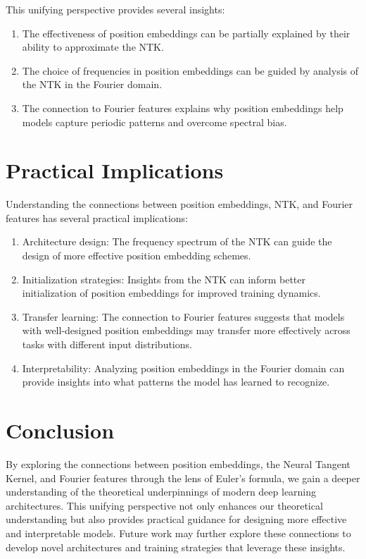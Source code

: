 \documentclass{article}
\begin{document}
This unifying perspective provides several insights:

\begin{enumerate}
    \item The effectiveness of position embeddings can be partially explained by their ability to approximate the NTK.
    \item The choice of frequencies in position embeddings can be guided by analysis of the NTK in the Fourier domain.
    \item The connection to Fourier features explains why position embeddings help models capture periodic patterns and overcome spectral bias.
\end{enumerate}

\section{Practical Implications}

Understanding the connections between position embeddings, NTK, and Fourier features has several practical implications:

\begin{enumerate}
    \item Architecture design: The frequency spectrum of the NTK can guide the design of more effective position embedding schemes.
    \item Initialization strategies: Insights from the NTK can inform better initialization of position embeddings for improved training dynamics.
    \item Transfer learning: The connection to Fourier features suggests that models with well-designed position embeddings may transfer more effectively across tasks with different input distributions.
    \item Interpretability: Analyzing position embeddings in the Fourier domain can provide insights into what patterns the model has learned to recognize.
\end{enumerate}

\section{Conclusion}

By exploring the connections between position embeddings, the Neural Tangent Kernel, and Fourier features through the lens of Euler's formula, we gain a deeper understanding of the theoretical underpinnings of modern deep learning architectures. This unifying perspective not only enhances our theoretical understanding but also provides practical guidance for designing more effective and interpretable models. Future work may further explore these connections to develop novel architectures and training strategies that leverage these insights.



\end{document}
